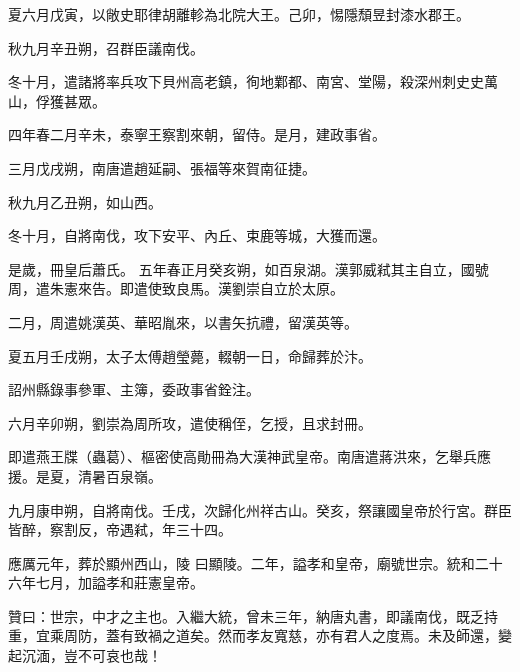 \begin{pinyinscope}
 夏六月戊寅，以敞史耶律胡離軫為北院大王。己卯，惕隱頹昱封漆水郡王。



 秋九月辛丑朔，召群臣議南伐。



 冬十月，遣諸將率兵攻下貝州高老鎮，徇地鄴都、南宮、堂陽，殺深州刺史史萬山，俘獲甚眾。



 四年春二月辛未，泰寧王察割來朝，留侍。是月，建政事省。



 三月戊戌朔，南唐遣趙延嗣、張福等來賀南征捷。



 秋九月乙丑朔，如山西。



 冬十月，自將南伐，攻下安平、內丘、束鹿等城，大獲而還。



 是歲，冊皇后蕭氏。
 五年春正月癸亥朔，如百泉湖。漢郭威弒其主自立，國號周，遣朱憲來告。即遣使致良馬。漢劉崇自立於太原。



 二月，周遣姚漢英、華昭胤來，以書矢抗禮，留漢英等。



 夏五月壬戌朔，太子太傅趙瑩薨，輟朝一日，命歸葬於汴。



 詔州縣錄事參軍、主簿，委政事省銓注。



 六月辛卯朔，劉崇為周所攻，遣使稱侄，乞授，且求封冊。



 即遣燕王牒（蟲葛）、樞密使高勛冊為大漢神武皇帝。南唐遣蔣洪來，乞舉兵應援。是夏，清暑百泉嶺。



 九月康申朔，自將南伐。壬戌，次歸化州祥古山。癸亥，祭讓國皇帝於行宮。群臣皆醉，察割反，帝遇弒，年三十四。



 應厲元年，葬於顯州西山，陵
 曰顯陵。二年，謚孝和皇帝，廟號世宗。統和二十六年七月，加謚孝和莊憲皇帝。



 贊曰：世宗，中才之主也。入繼大統，曾未三年，納唐丸書，即議南伐，既乏持重，宜乘周防，蓋有致禍之道矣。然而孝友寬慈，亦有君人之度焉。未及師還，變起沉湎，豈不可哀也哉！



\end{pinyinscope}